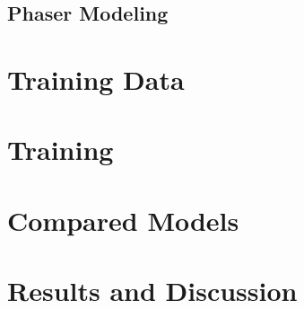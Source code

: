 \subsection{Phaser Modeling}

\section{Training Data}
\label{sec:phaser_training_data}

\section{Training}
\label{sec:phaser_training}

\section{Compared Models}
\label{sec:phaser_models}

\section{Results and Discussion}
\label{sec:phaser_results}

